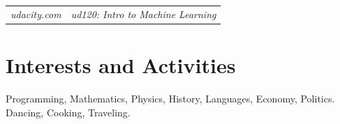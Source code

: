 \documentclass[a4paper,12pt]{article}
\begin{document}
\begin{tabular}[\textwidth]{r|p{13cm}}
    \em udacity.com
    & \textit{ud120: Intro to Machine Learning}\\
\end{tabular}

\section{Interests and Activities}

Programming, Mathematics, Physics, History, Languages, Economy, Politics.\\
Dancing, Cooking, Traveling.
\end{document}
